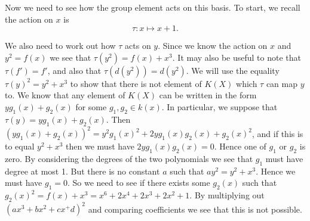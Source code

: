 \documentclass[draft, 11pt]{article} %
\theoremstyle{plain}
\theoremstyle{remark}
\newcommand{\cU}{{\mathcal U}}
\newcommand{\derhamhone}{H_{\text {dR}}^1(X/k)}
\DeclareMathOperator{\di}{div}
\begin{document}
\begin{comment}
From this we can compute what $\omega_3$ should be, which is
\begin{align}
\omega_3 & = \omega_2 - d\left(f_{23} \right) \\
& = \frac{x^4 + x^2}{y}dx + \frac{1}{2y(x-1)^3}\left( x^7 + x^5 + x^4 x^3\right) dx \\
& = \frac{1}{2y(x-1)^3} (2(x-1)^3(x^4+x^2) + x^7 + x^5 + x^4 + x^3) dx \\
& = \frac{1}{2y(x-1)^3}(2x^4+x^3+x^2)dx.
\end{align}

We next check that this is regular on $U_3 = X \backslash \pi^{-1}(1)$, a condition it must satisfy, by computing the divisor of the differential, which is
\begin{align}
\di( \omega_3 ) & = 3D_\infty -R+3D_\infty - 3D_1 + \di_0(2x^4+x^3+x^2) - 4D_\infty +R -2D_\infty \\
& = \di_0(2x^4 + x^3 +x^2) -3D_1,
\end{align}
and hence the differential is regular on $U_3$.

Now we need to check that this also works with $d(f_{13}) = \omega_1 - \omega_3$ by computing the right hand side, as follows
\begin{align}
\omega_1 - \omega_3 & = \frac{x^3+1}{2yx^2}dx - \frac{1}{2y(x-1)^3}( 2x^4+x^3+x^2) dx \\
& = \frac{1}{2yx^2(x-1)^3} ( (x-1)^3(x+1)^3 + x^6 + 2x^5 + 2x^4 ) dx \\
& = \frac{1}{2yx^2(x-1)^3}(2x^6+2x^5 + 2x^4 + 2) dx\\
& = d(f_{13}).
\end{align}
Hence the elements above form another (clearly linearly independent element) of $\derhamhone_{X/k}(\cU'')$.
\end{comment}

Now we need to see how the group element acts on this basis.
To start, we recall the action on $x$ is 
\[
\tau:x \mapsto x+1.
\]

We also need to work out how $\tau$ acts on $y$.
Since we know the action on $x$ and $y^2 = f(x)$ we see that $\tau(y^2) = f(x)+x^3$.
It may also be useful to note that $\tau(f') = f'$, and also that $\tau(d(y^2)) = d(y^2)$.
We will use the equality $\tau(y)^2 = y^2 + x^3$ to show that there is not element of $K(X)$ which $\tau$ can map $y$ to.
We know that any element of $K(X)$ can be written in the form $yg_1(x) + g_2(x)$ for some $g_1, g_2 \in k(x)$.
In particular, we suppose that $\tau(y)  = yg_1(x) + g_2(x)$.
Then $(yg_1(x) + g_2(x))^2 = y^2g_1(x)^2 + 2yg_1(x)g_2(x) + g_2(x)^2$, and if this is to equal $y^2 + x^3$ then we must have $2yg_1(x)g_2(x) = 0$.
Hence one of $g_1$ or $g_2$ is zero. 
By considering the degrees of the two polynomials we see that $g_1$ must have degree at most 1.
But there is no constant $a$ such that $ay^2 = y^2 + x^3$.
Hence we must have $g_1 = 0$.
So we need to see if there exists some $g_2(x)$ such that $g_2(x)^2 = f(x) + x^3 = x^6 + 2x^4 + 2x^3 + 2x^2 + 1$.
By multiplying out $(ax^3 + bx^2 + cx^ + d)^2$ and comparing coefficients we see that this is not possible.
\end{document}
